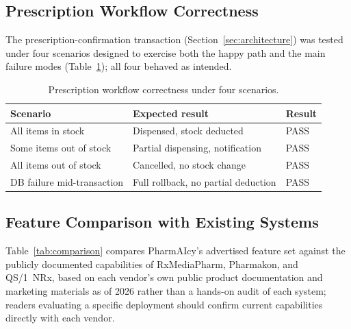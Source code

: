 \documentclass[12pt,a4paper]{article}
\begin{document}
\subsection{Prescription Workflow Correctness}

The prescription-confirmation transaction (Section~\ref{sec:architecture}) was tested under four scenarios designed to exercise both the happy path and the main failure modes (Table~\ref{tab:prescription}); all four behaved as intended.

\begin{table}[H]
\centering
\caption{Prescription workflow correctness under four scenarios.}
\label{tab:prescription}
\renewcommand{\arraystretch}{1.2}
\begin{tabular}{lll}
\toprule
\textbf{Scenario} & \textbf{Expected result} & \textbf{Result} \\
\midrule
All items in stock & Dispensed, stock deducted & PASS \\
Some items out of stock & Partial dispensing, notification & PASS \\
All items out of stock & Cancelled, no stock change & PASS \\
DB failure mid-transaction & Full rollback, no partial deduction & PASS \\
\bottomrule
\end{tabular}
\end{table}

\subsection{Feature Comparison with Existing Systems}

Table~\ref{tab:comparison} compares PharmAIcy's advertised feature set against the publicly documented capabilities of RxMediaPharm, Pharmakon, and QS/1~NRx, based on each vendor's own public product documentation and marketing materials as of 2026 rather than a hands-on audit of each system; readers evaluating a specific deployment should confirm current capabilities directly with each vendor.
\end{document}

